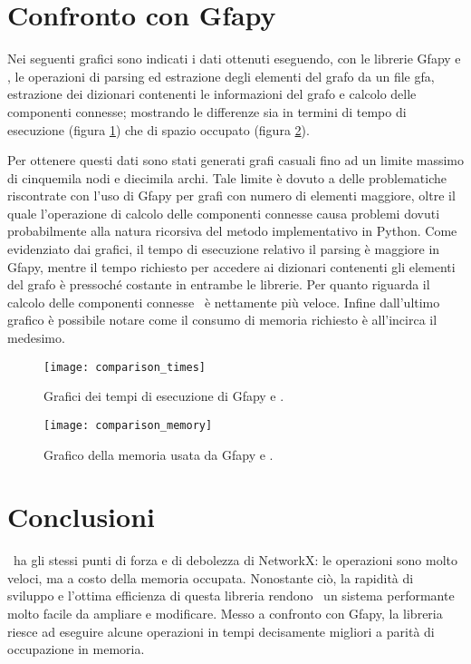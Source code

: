\section{Confronto con Gfapy}
Nei seguenti grafici sono indicati i dati ottenuti eseguendo, con le librerie
Gfapy e \pygfa, le operazioni di parsing ed estrazione degli elementi del
grafo da un file gfa, estrazione dei dizionari contenenti le informazioni
del grafo e calcolo delle componenti connesse; mostrando
le differenze sia in termini di tempo di esecuzione (figura \ref{fig:comparison-times})
che di spazio occupato (figura \ref{fig:comparison-memory}).

Per ottenere questi dati sono stati generati grafi casuali fino ad un limite massimo di cinquemila nodi
e diecimila archi. Tale limite è dovuto a delle problematiche riscontrate con l'uso di Gfapy
per grafi con numero di elementi maggiore, oltre il quale
l'operazione di calcolo delle componenti connesse causa problemi dovuti
probabilmente alla natura ricorsiva del metodo implementativo in Python.
Come evidenziato dai grafici, il tempo di esecuzione relativo il parsing
è maggiore in Gfapy, mentre il tempo richiesto per accedere ai dizionari
contenenti gli elementi del grafo è pressoché costante in entrambe le librerie.
Per quanto riguarda il calcolo delle componenti connesse \pygfa \ è nettamente
più veloce. Infine dall'ultimo grafico è possibile notare come il
consumo di memoria richiesto è all'incirca il medesimo.

\captionsetup{justification=centering, singlelinecheck=false}
\begin{figure}[h]
\centering
\texttt{[image: comparison\_times]}
\caption[Grafici dei tempi di esecuzione di Gfapy e \pygfa]{Grafici dei tempi di esecuzione di Gfapy e \pygfa.}
\label{fig:comparison-times}
\end{figure}
\captionsetup{justification=justified, singlelinecheck=false}


\captionsetup{justification=centering, singlelinecheck=false}
\begin{figure}[h]
\centering
\texttt{[image: comparison\_memory]}
\caption[Grafico della memoria usata da Gfapy e \pygfa]{Grafico della memoria usata da Gfapy e \pygfa.}
\label{fig:comparison-memory}
\end{figure}
\captionsetup{justification=justified, singlelinecheck=false}


\clearpage
\section{Conclusioni}
\pygfa \  ha gli stessi punti di forza e di debolezza di NetworkX:
le operazioni sono molto veloci, ma a costo della memoria occupata.
Nonostante ciò, la rapidità di sviluppo e l'ottima efficienza di questa libreria
rendono \pygfa \  un sistema performante molto facile da ampliare e modificare.
Messo a confronto con Gfapy, la libreria riesce ad eseguire alcune operazioni
in tempi decisamente migliori a parità di occupazione in memoria.
